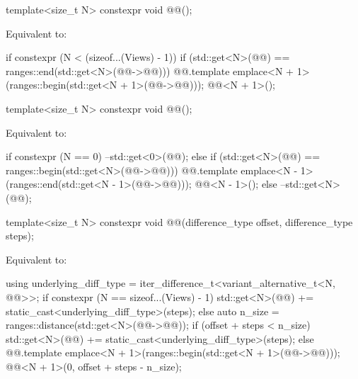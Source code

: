 %
\begin{itemdecl}
template<size_t N>
  constexpr void @@();
\end{itemdecl}

\begin{itemdescr}
\pnum
\effects
Equivalent to:
\begin{codeblock}
if constexpr (N < (sizeof...(Views) - 1)) {
  if (std::get<N>(@@) == ranges::end(std::get<N>(@@->@@))) {
    @@.template emplace<N + 1>(ranges::begin(std::get<N + 1>(@@->@@)));
    @@<N + 1>();
  }
}
\end{codeblock}
\end{itemdescr}

%
\begin{itemdecl}
template<size_t N>
  constexpr void @@();
\end{itemdecl}

\begin{itemdescr}
\pnum
\effects
Equivalent to:
\begin{codeblock}
if constexpr (N == 0) {
  --std::get<0>(@@);
} else {
  if (std::get<N>(@@) == ranges::begin(std::get<N>(@@->@@))) {
    @@.template emplace<N - 1>(ranges::end(std::get<N - 1>(@@->@@)));
    @@<N - 1>();
  } else {
    --std::get<N>(@@);
  }
}
\end{codeblock}
\end{itemdescr}

%
\begin{itemdecl}
template<size_t N>
  constexpr void @@(difference_type offset, difference_type steps);
\end{itemdecl}

\begin{itemdescr}
\pnum
\effects
Equivalent to:
\begin{codeblock}
using underlying_diff_type = iter_difference_t<variant_alternative_t<N, @@>>;
if constexpr (N == sizeof...(Views) - 1) {
  std::get<N>(@@) += static_cast<underlying_diff_type>(steps);
} else {
  auto n_size = ranges::distance(std::get<N>(@@->@@));
  if (offset + steps < n_size) {
    std::get<N>(@@) += static_cast<underlying_diff_type>(steps);
  } else {
    @@.template emplace<N + 1>(ranges::begin(std::get<N + 1>(@@->@@)));
    @@<N + 1>(0, offset + steps - n_size);
  }
}
\end{codeblock}
\end{itemdescr}

